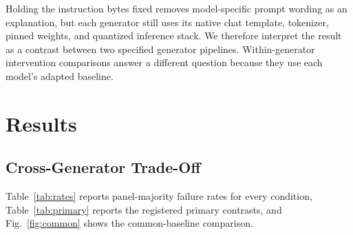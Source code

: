\documentclass[conference]{IEEEtran}
\begin{document}
Holding the instruction bytes fixed removes model-specific prompt wording as an explanation, but each generator still uses its native chat template, tokenizer, pinned weights, and quantized inference stack. We therefore interpret the result as a contrast between two specified generator pipelines. Within-generator intervention comparisons answer a different question because they use each model's adapted baseline.

\section{Results}
\label{sec:results}

\subsection{Cross-Generator Trade-Off}

Table~\ref{tab:rates} reports panel-majority failure rates for every condition, Table~\ref{tab:primary} reports the registered primary contrasts, and Fig.~\ref{fig:common} shows the common-baseline comparison.
\end{document}
